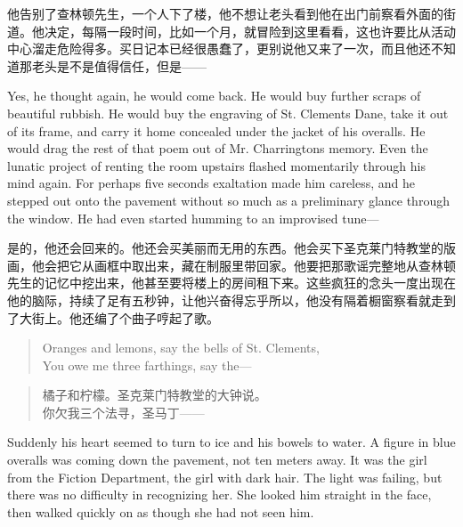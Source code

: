 \begin{paracol}{2}
\switchcolumn

他告别了查林顿先生，一个人下了楼，他不想让老头看到他在出门前察看外面的街道。他决定，每隔一段时间，比如一个月，就冒险到这里看看，这也许要比从活动中心溜走危险得多。买日记本已经很愚蠢了，更别说他又来了一次，而且他还不知道那老头是不是值得信任，但是——

\switchcolumn*

Yes, he thought again, he would come back. He would buy further scraps
of beautiful rubbish. He would buy the engraving of St.
Clement\textquotesingle s Dane, take it out of its frame, and carry it
home concealed under the jacket of his overalls. He would drag the rest
of that poem out of Mr. Charrington\textquotesingle s memory. Even the
lunatic project of renting the room upstairs flashed momentarily through
his mind again. For perhaps five seconds exaltation made him careless,
and he stepped out onto the pavement without so much as a preliminary
glance through the window. He had even started humming to an improvised
tune---

\switchcolumn

是的，他还会回来的。他还会买美丽而无用的东西。他会买下圣克莱门特教堂的版画，他会把它从画框中取出来，藏在制服里带回家。他要把那歌谣完整地从查林顿先生的记忆中挖出来，他甚至要将楼上的房间租下来。这些疯狂的念头一度出现在他的脑际，持续了足有五秒钟，让他兴奋得忘乎所以，他没有隔着橱窗察看就走到了大街上。他还编了个曲子哼起了歌。

\switchcolumn*

\begin{quotation}
\noindent Oranges and lemons, say the bells of St.
Clement\textquotesingle s,\\
You owe me three farthings, say the---\\
\end{quotation}

\switchcolumn

\begin{quotation}
\noindent 橘子和柠檬。圣克莱门特教堂的大钟说。\\
你欠我三个法寻，圣马丁——
\end{quotation}

\switchcolumn*

Suddenly his heart seemed to turn to ice and his bowels to water. A
figure in blue overalls was coming down the pavement, not ten meters
away. It was the girl from the Fiction Department, the girl with dark
hair. The light was failing, but there was no difficulty in recognizing
her. She looked him straight in the face, then walked quickly on as
though she had not seen him.


\end{paracol}
